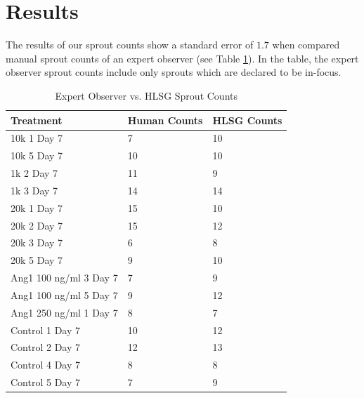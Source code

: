 \documentclass{sig-alternate}
\begin{document}
% 
% 

\section{Results} %
\label{sec:Results}
	The results of our sprout counts show a standard error of $1.7$ when
	compared manual sprout counts of an expert observer (see Table
	\ref{tab:resultcomp}). In the table, the expert observer sprout counts
	include only sprouts which are declared to be in-focus.

	\begin{table}[htp]
		\centering
		\begin{tabular}{| l | l | l |}
			\hline
			\textbf{Treatment} & \textbf{Human Counts} & \textbf{HLSG Counts} \\\hline
			10k 1 Day 7 & 7  & 10 \\\hline
			10k 5 Day 7 & 10 &  10 \\\hline
			1k 2 Day 7 & 11 & 9 \\\hline
			1k 3 Day 7 & 14 & 14 \\\hline
			20k 1 Day 7 & 15 & 10 \\\hline
			20k 2 Day 7 & 15 & 12 \\\hline
			20k 3 Day 7 & 6 & 8 \\\hline
			20k 5 Day 7 & 9 & 10 \\\hline
			Ang1 100 ng/ml 3 Day 7 & 7 & 9 \\\hline
			Ang1 100 ng/ml 5 Day 7 & 9 & 12 \\\hline
			Ang1 250 ng/ml 1 Day 7 & 8 & 7\\\hline
			Control 1 Day 7 & 10 & 12 \\\hline
			Control 2 Day 7 & 12 & 13 \\\hline
			Control 4 Day 7 & 8 & 8 \\\hline
			Control 5 Day 7 & 7 & 9 \\\hline
		\end{tabular}
		\caption{Expert Observer vs. HLSG Sprout Counts}
		\label{tab:resultcomp}
	\end{table}
\end{document}
